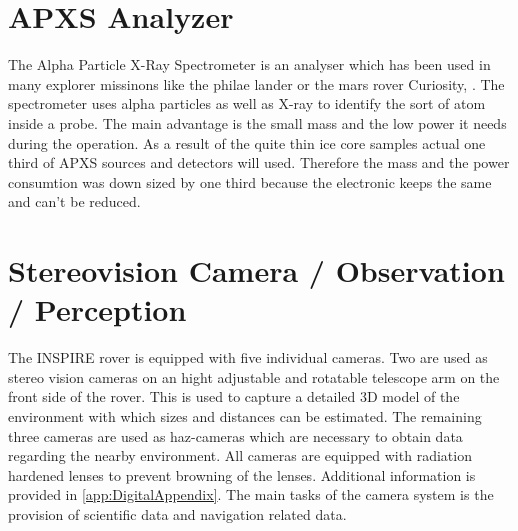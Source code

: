\section{APXS Analyzer}
The Alpha Particle X-Ray Spectrometer is an analyser which has been used in many explorer missinons like the philae lander or the mars rover Curiosity, \cite{ref_pay_1} \cite{ref_pay_2}.
The spectrometer uses alpha particles as well as X-ray to identify the sort of atom inside a probe.
The main advantage is the small mass and the  low power it needs during the operation.
As a result of the  quite thin ice core samples actual one third of APXS sources and detectors will used.
Therefore the mass and the power consumtion was down sized by one third because the electronic keeps the same and can't be reduced.


\section{Stereovision Camera / Observation / Perception}

The INSPIRE rover is equipped with five individual cameras. Two are used as stereo vision cameras on an hight adjustable and rotatable telescope arm on the front side of the rover. This is used to capture a detailed 3D model of the environment with which sizes and distances can be estimated. The remaining three cameras are used as haz-cameras which are necessary to obtain data regarding the nearby environment. All cameras are equipped with radiation hardened lenses to prevent browning of the lenses. Additional information is provided in \autoref{app:DigitalAppendix}. The main tasks of the camera system is the provision of scientific data and navigation related data. %

